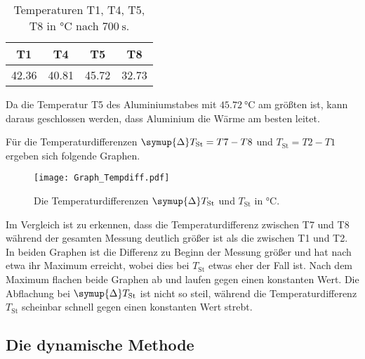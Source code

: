     \begin{table}
        \centering
        \caption{Temperaturen T1, T4, T5, T8 in $\si{\celsius}$ nach $\SI{700}{\second}$.} %
        \label{tab:temp700s}
        \begin{tabular}{c c c c}
            \toprule
            T1 & T4 & T5 & T8 \\
            \midrule
            42.36 & 40.81 & 45.72 & 32.73 \\ %
            \bottomrule  
        \end{tabular}
    \end{table}
    Da die Temperatur T5 des Aluminiumstabes mit $\SI{45.72}{\celsius}$ am größten ist,
    kann daraus geschlossen werden, dass Aluminium die Wärme am besten leitet.


    Für die Temperaturdifferenzen $\symup{\Delta}T_\text{St} = T7 - T8$ und 
    $T_\text{St} = T2 - T1$ ergeben sich folgende Graphen.
    \begin{figure}
        \centering
        \texttt{[image: Graph\_Tempdiff.pdf]}
        \caption{Die Temperaturdifferenzen $\symup{\Delta}T_\text{St}$ und $T_\text{St}$ in $\si{\celsius}$.}
        \label{fig:graphtempdiff}
    \end{figure}
    Im Vergleich ist zu erkennen, dass die Temperaturdifferenz zwischen T7 und T8 während der gesamten
    Messung deutlich größer ist als die zwischen T1 und T2.
    In beiden Graphen ist die Differenz zu Beginn der Messung größer und hat nach etwa %
    ihr Maximum erreicht, wobei dies bei $T_\text{St}$ etwas eher der Fall ist.
    Nach dem Maximum flachen beide Graphen ab und laufen gegen einen konstanten Wert.
    Die Abflachung bei $\symup{\Delta}T_\text{St}$ ist nicht so steil, während die Temperaturdifferenz
    $T_\text{St}$ scheinbar schnell gegen einen konstanten Wert strebt. %


    \subsection{Die dynamische Methode}
